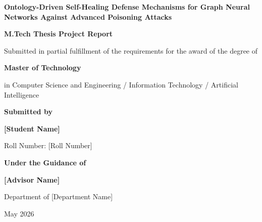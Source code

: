 \documentclass[12pt,oneside]{report}
\begin{document}

\begin{titlepage}
\centering
\vspace*{0.3in}
{\fontsize{16}{20}\selectfont\bfseries Ontology-Driven Self-Healing Defense Mechanisms for Graph Neural Networks Against Advanced Poisoning Attacks\par}
\vspace{0.35in}
{\fontsize{14}{17}\selectfont\bfseries M.Tech Thesis Project Report\par}
\vspace{0.25in}
{\fontsize{12}{15}\selectfont Submitted in partial fulfillment of the requirements for the award of the degree of\par}
\vspace{0.18in}
{\fontsize{14}{17}\selectfont\bfseries Master of Technology\par}
\vspace{0.18in}
{\fontsize{12}{15}\selectfont in Computer Science and Engineering / Information Technology / Artificial Intelligence\par}
\vspace{0.45in}
{\fontsize{12}{15}\selectfont\bfseries Submitted by\par}
\vspace{0.1in}
{\fontsize{14}{17}\selectfont\bfseries [Student Name]\par}
{\fontsize{12}{15}\selectfont Roll Number: [Roll Number]\par}
\vspace{0.35in}
{\fontsize{12}{15}\selectfont\bfseries Under the Guidance of\par}
\vspace{0.1in}
{\fontsize{14}{17}\selectfont\bfseries [Advisor Name]\par}
{\fontsize{12}{15}\selectfont [Designation]\par}
\vspace{0.35in}
\vfill
{\fontsize{12}{15}\selectfont Department of [Department Name]\par}
{\fontsize{12}{15}\par}
{\fontsize{12}{15}\par}
{\fontsize{12}{15}\selectfont May 2026\par}
\end{titlepage}
\end{document}
